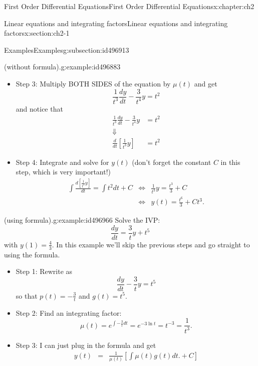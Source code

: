 \documentclass[oneside,10pt,]{book}
\numberwithin{equation}{section}
\numberwithin{equation}{section}
\newcommand{\amp}{&}
\begin{document}
\begin{chapterptx}{First Order Differential Equations}{}{First Order Differential Equations}{}{}{x:chapter:ch2}
\begin{sectionptx}{Linear equations and integrating factors}{}{Linear equations and integrating factors}{}{}{x:section:ch2-1}
\begin{subsectionptx}{Examples}{}{Examples}{}{}{g:subsection:id496913}
\begin{example}{(without formula).}{g:example:id496883}
\begin{itemize}[label=\textbullet]
Note we only need an integrating factor, not a general integrating factor. So we never need to have a \(+C\) in this step! In the next step we will note that we also don't need the absolute value inside the natural log (why not?).%
\item{}Step 3: Multiply BOTH SIDES of the equation by \(\mu(t)\) and get%
\begin{equation*}
\frac{1}{t^{3}}\frac{dy}{dt}-\frac{3}{t^{4}}y=t^{2}
\end{equation*}
and notice that%
\begin{align*}
\frac{1}{t^{3}}\frac{dy}{dt}-\frac{3}{t^{4}}y \amp =t^{2}\\
\Downarrow\\
\frac{d}{dt} \left[\frac{1}{t^{3}}y\right]\amp =t^{2}
\end{align*}
%
\item{}Step 4: Integrate and solve for \(y(t)\) (don't forget the constant \(C\) in this step, which is very important!)%
\begin{align*}
\int\frac{d\left[\frac{1}{t^{3}}y\right]}{dt}=\int t^{2}dt+C \amp \iff \amp \frac{1}{t^{3}}y=\frac{t^{3}}{3}+C\\
\amp \iff \amp y(t)=\frac{t^{6}}{3}+Ct^{3}.
\end{align*}
%
\end{itemize}
\end{example}
\begin{example}{(using formula).}{g:example:id496966}%
Solve the IVP:%
\begin{equation*}
\frac{dy}{dt}=\frac{3}{t}y+t^{5}
\end{equation*}
with \(y(1)=\frac{4}{3}\). In this example we'll skip the previous steps and go straight to using the formula.%
%
\begin{itemize}[label=\textbullet]
\item{}Step 1: Rewrite as%
\begin{equation*}
\frac{dy}{dt}-\frac{3}{t}y=t^{5}
\end{equation*}
so that \(p(t)=-\frac{3}{t}\) and \(g(t)=t^{5}\).%
\item{}Step 2: Find an integrating factor:%
\begin{equation*}
\mu(t)=e^{\int-\frac{3}{t}dt}=e^{-3\ln t}=t^{-3}=\frac{1}{t^{3}}.
\end{equation*}
%
\item{}Step 3: I can just plug in the formula and get%
\begin{align*}
y(t) \amp = \amp \frac{1}{\mu(t)}\left[\int\mu(t)g(t)dt.+C\right]\\

\end{align*}
\end{itemize}
\end{example}
\end{subsectionptx}
\end{sectionptx}
\end{chapterptx}
\end{document}
